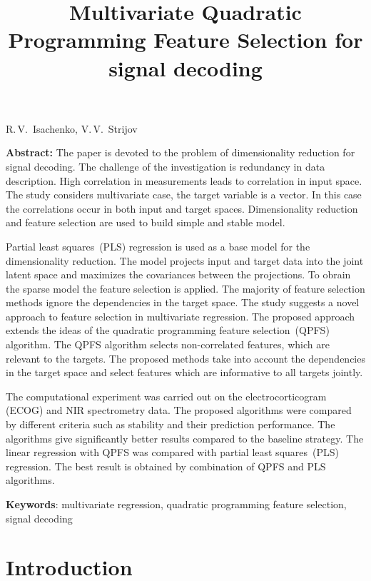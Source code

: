 \documentclass[12pt,twoside]{article}
\theoremstyle{definition}
\begin{document}
	
	\linenumbers
	
	\title
{Multivariate Quadratic Programming Feature Selection for signal decoding}
\date{}
\maketitle
\begin{center}
	R.\,V.~Isachenko,
	V.\,V.~Strijov
\end{center}
\textbf{Abstract:} 
The paper is devoted to the problem of dimensionality reduction for signal decoding.
The challenge of the investigation is redundancy in data description. 
High correlation in measurements leads to correlation in input space. 
The study considers multivariate case, the target variable is a vector.
In this case the correlations occur in both input and target spaces.
Dimensionality reduction and feature selection are used to build simple and stable model.

Partial least squares~(PLS) regression is used as a base model for the dimensionality reduction.
The model projects input and target data into the joint latent space and maximizes the covariances between the projections.
To obrain the sparse model the feature selection is applied.
The majority of feature selection methods ignore the dependencies in the target space.
The study suggests a novel approach to feature selection in multivariate regression.
The proposed approach extends the ideas of the quadratic programming feature selection~(QPFS) algorithm. 
The QPFS algorithm selects non-correlated features, which are relevant to the targets. 
The proposed methods take into account the dependencies in the target space and select features which are informative to all targets jointly.

The computational experiment was carried out on the electrocorticogram (ECOG) and NIR spectrometry data. 
The proposed algorithms were compared by different criteria such as stability and their prediction performance.
The algorithms give significantly better results compared to the baseline strategy.
The linear regression with QPFS was compared with partial least squares~(PLS) regression.
The best result is obtained by combination of QPFS and PLS algorithms.

\bigskip
\textbf{Keywords}: multivariate regression, quadratic programming feature selection, signal decoding

\section{Introduction}
\end{document}

